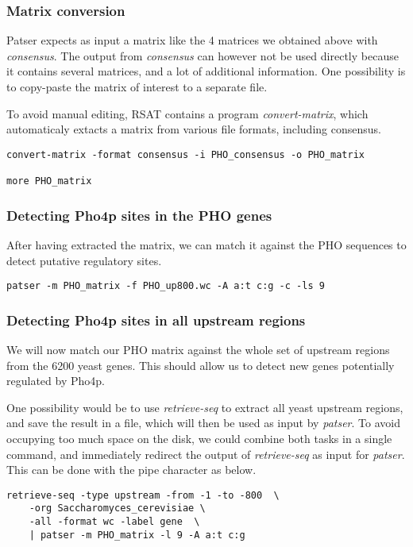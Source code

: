 \subsubsection{Matrix conversion}

Patser expects as input a matrix like the 4 matrices we obtained above
with \textit{consensus}. The output from \textit{consensus} can however
not be used directly because it contains several matrices, and a lot
of additional information. One possibility is to copy-paste the matrix
of interest to a separate file.

To avoid manual editing, RSAT contains a program
\textit{convert-matrix}, which automaticaly extacts a matrix from
various file formats, including consensus.

\begin{verbatim}
convert-matrix -format consensus -i PHO_consensus -o PHO_matrix 

more PHO_matrix
\end{verbatim}


\subsubsection{Detecting Pho4p sites in the PHO genes}

After having extracted the matrix, we can match it against the PHO
sequences to detect putative regulatory sites.

\begin{verbatim}
patser -m PHO_matrix -f PHO_up800.wc -A a:t c:g -c -ls 9
\end{verbatim}

\subsubsection{Detecting Pho4p sites in all upstream regions}

We will now match our PHO matrix against the whole set of upstream
regions from the 6200 yeast genes. This should allow us to detect new
genes potentially regulated by Pho4p.

One possibility would be to use \textit{retrieve-seq} to extract all
yeast upstream regions, and save the result in a file, which will then
be used as input by \textit{patser}. To avoid occupying too much space
on the disk, we could combine both tasks in a single command, and
immediately redirect the output of \textit{retrieve-seq} as input for
\textit{patser}. This can be done with the pipe character as below. 


\begin{verbatim}
retrieve-seq -type upstream -from -1 -to -800  \
    -org Saccharomyces_cerevisiae \
    -all -format wc -label gene  \
    | patser -m PHO_matrix -l 9 -A a:t c:g
\end{verbatim}

